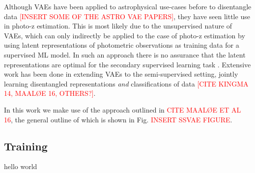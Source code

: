Although VAEs have been applied to astrophysical use-cases before to disentangle data \textcolor{red}{[INSERT SOME OF THE ASTRO VAE PAPERS]}, they have seen little use in photo-z estimation. This is most likely due to the unsupervised nature of VAEs, which can only indirectly be applied to the case of photo-z estimation by using latent representations of photometric observations as training data for a supervised ML model. In such an approach there is no assurance that the latent representations are optimal for the secondary supervised learning task \citep{kingmaSemiSupervisedLearningDeep2014}. Extensive work has been done in extending VAEs to the semi-supervised setting, jointly learning disentangled representations \textit{and} classifications of data \textcolor{red}{[CITE KINGMA 14, MAALØE 16, OTHERS?]}.

In this work we make use of the approach outlined in \textcolor{red}{CITE MAALØE ET AL 16}, the general outline of which is shown in Fig. \textcolor{red}{INSERT SSVAE FIGURE}.


\subsection{Training}
\label{subsec:training}

hello world